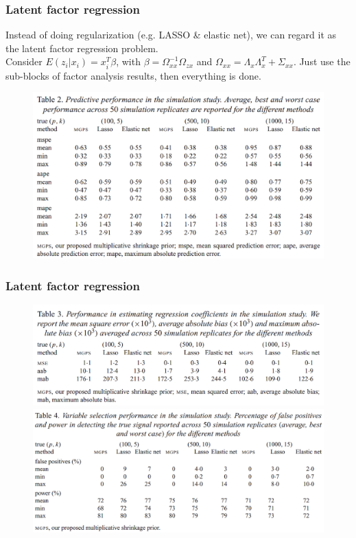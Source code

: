 \documentclass{beamer}
\begin{document}
	\begin{frame}
		\frametitle{Latent factor regression}
		Instead of doing regularization (e.g. LASSO \& elastic net), we can regard it as the latent factor regression problem.\\
		Consider $E(z_i|x_i) = x_i^T\beta$, with $\beta = \Omega_{xx}^{-1}\Omega_{zx}$ and $\Omega_{xx} = \Lambda_x\Lambda_x^T + \Sigma_{xx}$. Just use the sub-blocks of factor analysis results, then everything is done. 
		\begin{figure}
			\includegraphics[width=0.8\linewidth]{image005.png}
		\end{figure}
	\end{frame}
	
	\begin{frame}
		\frametitle{Latent factor regression}
		\begin{figure}
			\includegraphics[width=0.8\linewidth]{image006.png}
			\includegraphics[width=0.8\linewidth]{image007.png}
		\end{figure}
	\end{frame}
	
\end{document}
